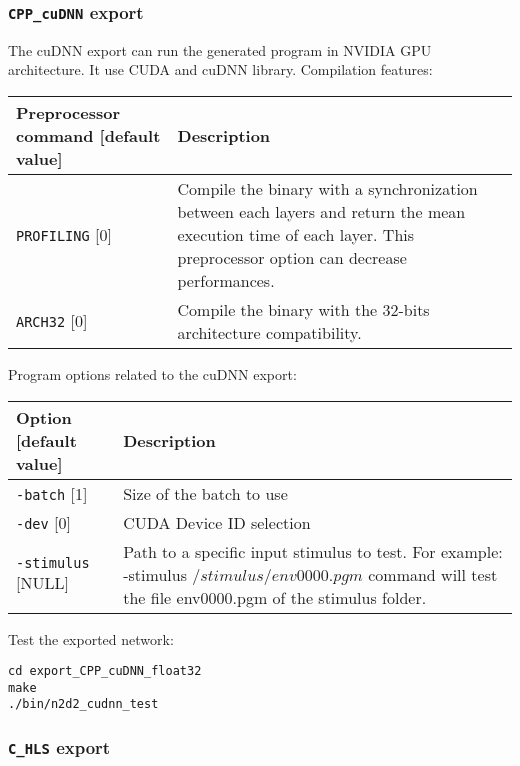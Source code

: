 \documentclass[a4paper,11pt,oneside]{article}
\newcommand{\iponly}{\reversemarginpar
    \marginnote{\color{listletiblue}\normalfont\scriptsize
    {\ttfamily{}\hyperref[sec:N2D2-IP]{\color{listletiblue}N2D2 IP}} \emph{only}}}
\begin{document}
\subsubsection{\texorpdfstring{%
\lstinline[basicstyle=\ttfamily\bfseries]!CPP_cuDNN! export}{CPP\_cuDNN export}}
The cuDNN export can run the generated program in NVIDIA GPU architecture.
It use CUDA and cuDNN library.
Compilation features:
\begin{center}
 \begin{tabular}{| p{7cm} | p{8cm} | }
 \hline
 Preprocessor command [default value] & Description\\
 \hline\hline
  \lstinline!PROFILING! [0] & Compile the binary with a synchronization
  between each layers and return the mean execution time of each layer.
  This preprocessor option can decrease performances.\\
  \lstinline!ARCH32! [0] & Compile the binary with the 32-bits architecture
   compatibility.\\
 \hline
\end{tabular}
\end{center}

Program options related to the cuDNN export:
\begin{center}
 \begin{tabular}{| p{5cm} | p{10cm} | }
 \hline
 Option [default value] & Description\\
 \hline\hline
  \lstinline!-batch! [1] & Size of the batch to use \\
  \lstinline!-dev! [0] & CUDA Device ID selection  \\
  \lstinline!-stimulus! [NULL] & Path to a specific input stimulus to test.
  For example: -stimulus ${/stimulus/env0000.pgm}$ command will test the file
   env0000.pgm  of the stimulus folder.\\
 \hline
\end{tabular}
\end{center}

Test the exported network:
\begin{lstlisting}
cd export_CPP_cuDNN_float32
make
./bin/n2d2_cudnn_test
\end{lstlisting}

\subsubsection{\texorpdfstring{%
\lstinline[basicstyle=\ttfamily\bfseries]!C_HLS! export\protect\iponly}
{C\_HLS export}}
\end{document}
